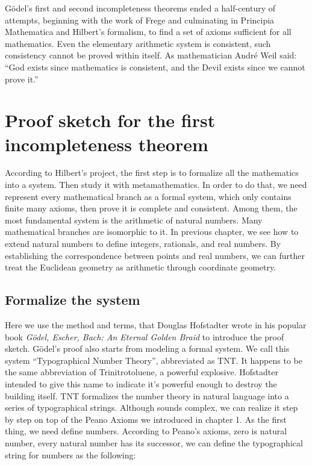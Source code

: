\documentclass{article}
\begin{document}
Gödel's first and second incompleteness theorems ended a half-century of attempts, beginning with the work of Frege and culminating in Principia Mathematica and Hilbert's formalism, to find a set of axioms sufficient for all mathematics. Even the elementary arithmetic system is consistent, such consistency cannot be proved within itself. As mathematician André Weil said: ``God exists since mathematics is consistent, and the Devil exists since we cannot prove it.''\cite{HanXueTao16}

\section{Proof sketch for the first incompleteness theorem}

According to Hilbert's project, the first step is to formalize all the mathematics into a system. Then study it with metamathematics. In order to do that, we need represent every mathematical branch as a formal system, which only contains finite many axioms, then prove it is complete and consistent. Among them, the most fundamental system is the arithmetic of natural numbers. Many mathematical branches are isomorphic to it. In previous chapter, we see how to extend natural numbers to define integers, rationals, and real numbers. By establishing the correspondence between points and real numbers, we can further treat the Euclidean geometry as arithmetic through coordinate geometry.

\subsection{Formalize the system}
 
Here we use the method and terms, that Douglas Hofstadter wrote in his popular book {\em Gödel, Escher, Bach: An Eternal Golden Braid} to introduce the proof sketch. Gödel's proof also starts from modeling a formal system. We call this system ``Typographical Number Theory'', abbreviated as TNT. It happens to be the same abbreviation of Trinitrotoluene, a powerful explosive. Hofstadter intended to give this name to indicate it's powerful enough to destroy the building itself. TNT formalizes the number theory in natural language into a series of typographical strings. Although sounds complex, we can realize it step by step on top of the Peano Axioms we introduced in chapter 1. As the first thing, we need define numbers. According to Peano's axioms, zero is natural number, every natural number has its successor, we can define the typographical string for numbers as the following:
\end{document}
